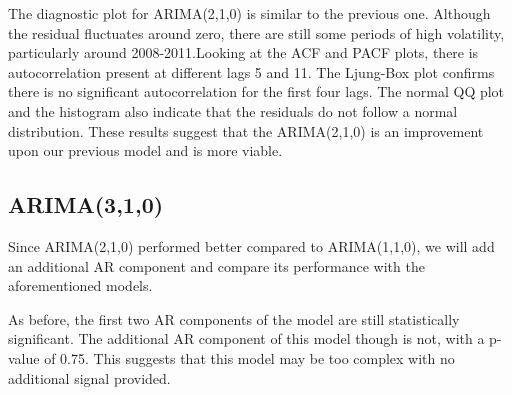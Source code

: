 \documentclass[12pt]{article}
\begin{document}
The diagnostic plot for ARIMA(2,1,0) is similar to the previous one. Although the residual fluctuates around zero, there are still some periods of high volatility, particularly around 2008-2011.Looking at the ACF and PACF plots, there is autocorrelation present at different lags 5 and 11. The Ljung-Box plot confirms there is no significant autocorrelation for the first four lags. The normal QQ plot and the histogram also indicate that the residuals do not follow a normal distribution. These results suggest that the ARIMA(2,1,0) is an improvement upon our previous model and is more viable.

\newpage

\subsection{ARIMA(3,1,0)}
Since ARIMA(2,1,0) performed better compared to ARIMA(1,1,0), we will add an additional AR component and compare its performance with the aforementioned models.




As before, the first two AR components of the model are still statistically significant. The additional AR component of this model though is not, with a p-value of 0.75. This suggests that this model may be too complex with no additional signal provided.
\end{document}
